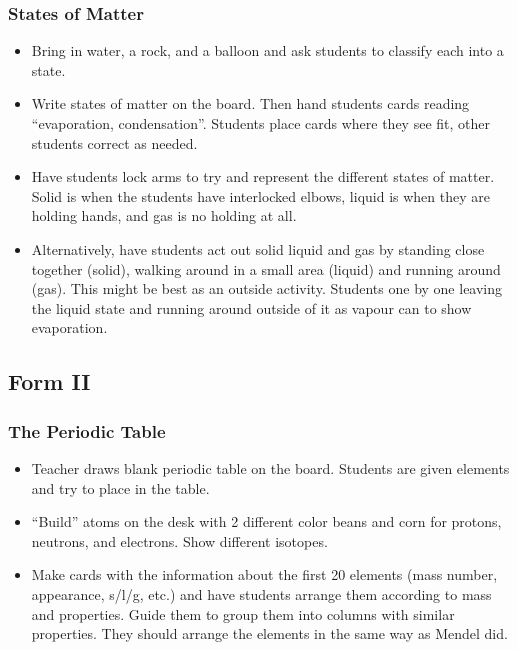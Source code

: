 \subsubsection{States of Matter}
\begin{itemize}
\item	Bring in water, a rock, and a balloon and ask students to classify each into a state.
\item	Write states of matter on the board.  Then hand students cards reading “evaporation, condensation”.  Students place cards where they see fit, other students correct as needed.
\item	Have students lock arms to try and represent the different states of matter. Solid is when the students have interlocked elbows, liquid is when they are holding hands, and gas is no holding at all.
\item	Alternatively, have students act out solid liquid and gas by standing close together (solid), walking around in a small area (liquid) and running around (gas). This might be best as an outside activity. Students one by one leaving the liquid state and running around outside of it as vapour can to show evaporation.
\end{itemize}

\subsection{Form II}
\subsubsection{The Periodic Table}
\begin{itemize}
\item	Teacher draws blank periodic table on the board.  Students are given elements and try to place in the table.
\item	“Build” atoms on the desk with 2 different color beans and corn for protons, neutrons, and electrons. Show different isotopes.
\item	Make cards with the information about the first 20 elements (mass number, appearance, s/l/g, etc.) and have students arrange them according to mass and properties. Guide them to group them into columns with similar properties. They should arrange the elements in the same way as Mendel did.  
\end{itemize}

